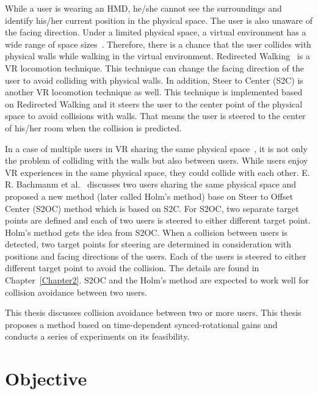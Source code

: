 While a user is wearing an HMD, he/she cannot see the surroundings and identify his/her current position in the physical space. The user is also unaware of the facing direction. Under a limited physical space, a virtual environment has a wide range of space sizes~\cite{10.1145/1272582.1272590}. Therefore, there is a chance that the user collides with physical walls while walking in the virtual environment. Redirected Walking~\cite{7892373} is a VR locomotion technique. This technique can change the facing direction of the user to avoid colliding with physical walls. In addition, Steer to Center (S2C) is another VR locomotion technique as well. This technique is implemented based on Redirected Walking and it steers the user to the center point of the physical space to avoid collisions with walls. That means the user is steered to the center of his/her room when the collision is predicted.

In a case of multiple users in VR sharing the same physical space~\cite{7892235}, it is not only the problem of colliding with the walls but also between users. While users enjoy VR experiences in the same physical space, they could collide with each other. E. R. Bachmanm et al.~\cite{6549377} discusses two users sharing the same physical space and proposed a new method (later called Holm's method) base on Steer to Offset Center (S2OC) method which is based on S2C. For S2OC, two separate target points are defined and each of two users is steered to either different target point. Holm's method gets the idea from S2OC. When a collision between users is detected, two target points for steering are determined in consideration with positions and facing directions of the users. Each of the users is steered to either different target point to avoid the collision. The details are found in Chapter~\ref{Chapter2}. S2OC and the Holm's method are expected to work well for collision avoidance between two users.

This thesis discusses collision avoidance between two or more users. This thesis proposes a method based on time-dependent synced-rotational gains and conducts a series of experiments on its feasibility.




\section{Objective}

